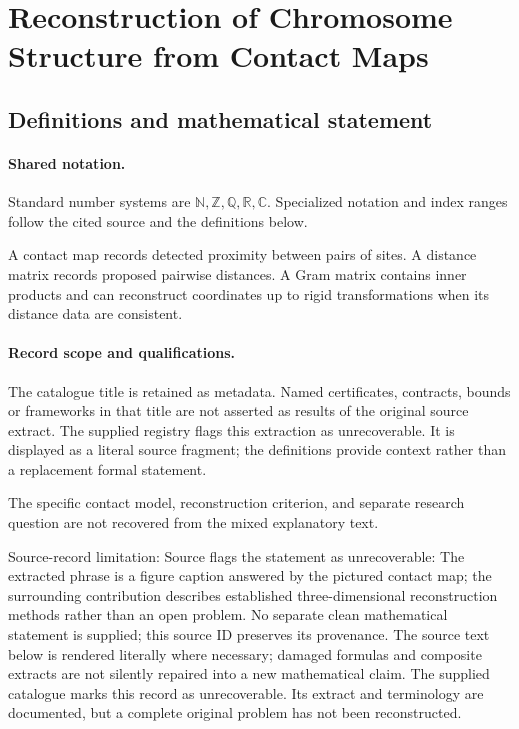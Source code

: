 \documentclass[11pt]{article}
\begin{document}
\section{Reconstruction of Chromosome Structure from Contact Maps}\label{statement}

\subsection{Definitions and mathematical statement}

\paragraph{Shared notation.}Standard number systems are $\mathbb N,\mathbb Z,\mathbb Q,\mathbb R,\mathbb C$. Specialized notation and index ranges follow the cited source and the definitions below.


A contact map records detected proximity between pairs of sites. A distance matrix records proposed pairwise distances. A Gram matrix contains inner products and can reconstruct coordinates up to rigid transformations when its distance data are consistent.
\paragraph{Record scope and qualifications.}
The catalogue title is retained as metadata. Named certificates, contracts, bounds or frameworks in that title are not asserted as results of the original source extract.
The supplied registry flags this extraction as unrecoverable. It is displayed as a literal source fragment; the definitions provide context rather than a replacement formal statement.

The specific contact model, reconstruction criterion, and separate research question are not recovered from the mixed explanatory text.

Source-record limitation: Source flags the statement as unrecoverable: The extracted phrase is a figure caption answered by the pictured contact map; the surrounding contribution describes established three-dimensional reconstruction methods rather than an open problem. No separate clean mathematical statement is supplied; this source ID preserves its provenance.
The source text below is rendered literally where necessary; damaged formulas and composite extracts are not silently repaired into a new mathematical claim.
The supplied catalogue marks this record as unrecoverable. Its extract and terminology are documented, but a complete original problem has not been reconstructed.
\end{document}
